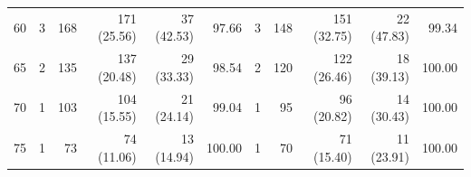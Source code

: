 \begin{table}
\begin{tabular}{r rrrrr rrrrr}
60 & 3 & 168 & 171 (25.56) & 37 (42.53) & 97.66 & 3 & 148 & 151 (32.75) & 22 (47.83) & 99.34\\
65 & 2 & 135 & 137 (20.48) & 29 (33.33) & 98.54 & 2 & 120 & 122 (26.46) & 18 (39.13) & 100.00\\
70 & 1 & 103 & 104 (15.55) & 21 (24.14) & 99.04 & 1 & 95 & 96 (20.82) & 14 (30.43) & 100.00\\
75 & 1 & 73 & 74 (11.06) & 13 (14.94) & 100.00 & 1 & 70 & 71 (15.40) & 11 (23.91) & 100.00\\

\end{tabular}
\end{table}
